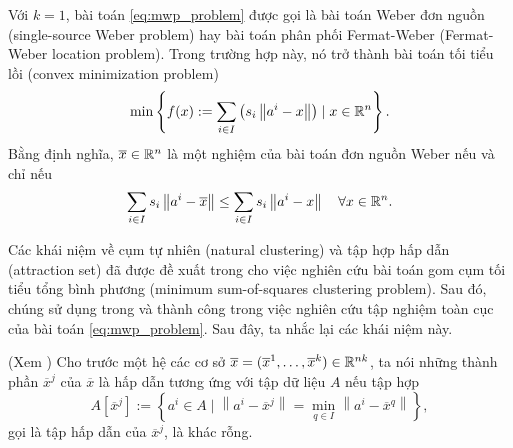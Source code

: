 \documentclass[a4paper]{report}
\begin{document}
    Với $k =1$, bài toán \eqref{eq:mwp_problem} được gọi là bài toán Weber đơn nguồn (single-source Weber problem) hay bài toán phân phối Fermat-Weber (Fermat-Weber location problem). Trong trường hợp này, nó trở thành bài toán tối tiểu lồi (convex minimization problem)
        \begin{equation}
            \min\left\{f(x) := \sum_{i \in I}\left(s_i\left\| a^i - x\right\|\right) \mid x \in \mathbb{R}^n\right\}.
        \end{equation}
        Bằng định nghĩa, $\overline{x} \in \mathbb{R}^n$ là một nghiệm của bài toán đơn nguồn Weber nếu và chỉ nếu 
        \begin{equation}
            \sum_{i \in I}s_i\left\| a^i - \overline{x}\right\| \leq \sum_{i \in I}s_i\left\| a^i - x\right\|\quad \forall x \in \mathbb{R}^n.  
        \end{equation}

        Các khái niệm về cụm tự nhiên (natural clustering) và tập hợp hấp dẫn (attraction set) đã được đề xuất trong \cite{cuong2020qualitative} cho việc nghiên cứu bài toán gom cụm tối tiểu tổng bình phương (minimum sum-of-squares clustering problem). Sau đó, chúng sử dụng trong \cite{cuong2023global} và thành công trong việc nghiên cứu tập nghiệm toàn cục của bài toán \ref{eq:mwp_problem}. Sau đây, ta nhắc lại các khái niệm này.

        \begin{definition}
            (Xem \cite{cuong2020qualitative,cuong2023global}) Cho trước một hệ các cơ sở $\overline{x} = (\overline{x}^1, \dots, \overline{x}^k) \in \mathbb{R}^{nk}$, ta nói những thành phần $\overline{x}^j$ của $\overline{x}$ là hấp dẫn tương ứng với tập dữ liệu $A$ nếu tập hợp
            \begin{equation}
                A[\overline{x}^j] := \left\{
                    a^i \in A \mid \left\| a^i - \overline{x}^j\right\| = \min_{q \in I}\left\| a^i - \overline{x}^q\right\|  
                \right\},
            \end{equation}
            gọi là tập hấp dẫn của $\overline{x}^j$, là khác rỗng.
        \end{definition}
\end{document}
